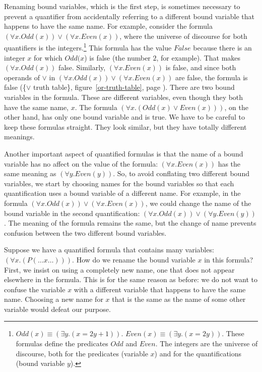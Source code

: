 {{Renaming bound variables, which is the first step, is sometimes necessary to prevent
a quantifier from accidentally referring to a different bound variable
that happens to have the same name.
For example, consider the formula
$(\forall x.Odd(x)) \vee (\forall x.Even(x))$,
where the universe of discourse for both quantifiers is the integers.\footnote{$Odd(x) \equiv (\exists y.(x = 2y+1))$.
\label{even-number-predicate-Even}
$Even(x) \equiv (\exists y.(x = 2y))$.
These formulas define the predicates $Odd$ and $Even$.
The integers are the universe of discourse,
both for the predicates (variable $x$)
and for the quantifications (bound variable $y$).}
This formula has the value $False$ because there
is an integer $x$ for which $Odd(x$) is false (the number $2$, for example).
That makes $(\forall x.Odd(x))$ false.
Similarly, $(\forall x.Even(x))$ is false,
and since both operands of $\vee$ in $(\forall x.Odd(x)) \vee (\forall x.Even(x))$
are false, the formula is false (\{$\vee$ truth table\},
figure~\ref{or-truth-table}, page \pageref{or-truth-table}).
There are two bound variables in the formula.
These are different variables, even though they both have
the same name, $x$.
The formula $(\forall x.(Odd(x) \vee Even(x)))$, on the other hand,
has only one bound variable and is true.
We have to be careful to keep these formulas straight.
They look similar, but they have totally different meanings.

Another important aspect of quantified formulas is that
the name of a bound variable has no affect on the value
of the formula:
$(\forall x.Even(x))$ has the same meaning
as $(\forall y.Even(y))$.
So, to avoid conflating two different bound variables,
we start by choosing names for the bound variables
so that each quantification uses a bound variable of a different name.
For example, in the formula
$(\forall x.Odd(x)) \vee (\forall x.Even(x))$,
we could change the name of the bound variable
in the second quantification:
$(\forall x.Odd(x)) \vee (\forall y.Even(y))$.
The meaning of the formula remains the same,
but the change of name prevents confusion between the two different bound variables.

Suppose we have a quantified formula that contains
many variables: $(\forall x.(P(\dots x \dots)))$.
How do we rename the bound variable $x$ in this formula?
First, we insist on using a completely new name,
one that does not appear elsewhere in the formula.
This is for the same reason as before: we do not want to confuse the variable
$x$ with a different variable that happens to have the same name.
Choosing a new name for $x$ that is the same as the name
of some other variable would defeat our purpose.

}}
